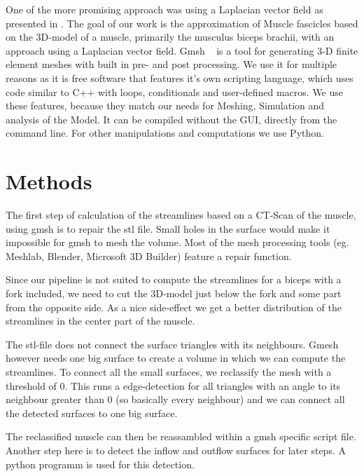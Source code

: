 \documentclass[preprint,journal]{vgtc}       %
\begin{document}
One of the more promising approach was using a Laplacian vector field as presented in \cite{Choi2013}. 
The goal of our work is the approximation of Muscle fascicles based on the 3D-model of a muscle, primarily the musculus biceps brachii, with an approach using a Laplacian vector field. Gmsh ~\cite{Geuzaine2009} is a tool for generating 3-D finite element meshes with built in pre- and post processing. We use it for multiple reasons as it is free software that features it's own scripting language, which uses code similar to C++ with loops, conditionals and user-defined macros. We use these features, because they match our needs for Meshing, Simulation and analysis of the Model. It can be compiled without the GUI, directly from the command line. For other manipulations and computations we use Python.

%
%
%
\section{Methods}
The first step of calculation of the streamlines based on a CT-Scan of the muscle, using gmsh is to repair the stl file. Small holes in the surface would make it impossible for gmsh to mesh the volume. Most of the mesh processing tools (eg. Meshlab, Blender, Microsoft 3D Builder) feature a repair function. 

Since our pipeline is not suited to compute the streamlines for a biceps with a fork included, we need to cut the 3D-model just below the fork and some part from the opposite side. As a nice side-effect we get a better distribution of the streamlines in the center part of the muscle.

The stl-file does not connect the surface triangles with its neighbours. Gmesh however needs one big surface to create a 
volume in which we can compute the streamlines. To connect all the small surfaces, we reclassify the mesh with a threshold of 0.
This runs a edge-detection for all triangles with an angle to its neighbour greater than 0 (so basically every neighbour) and we can connect all the 
detected surfaces to one big surface.

The reclassified muscle can then be reassambled within a gmsh specific script file. Another step here is to detect the inflow and outflow surfaces for later steps. A python programm is used for this detection. 
\end{document}
